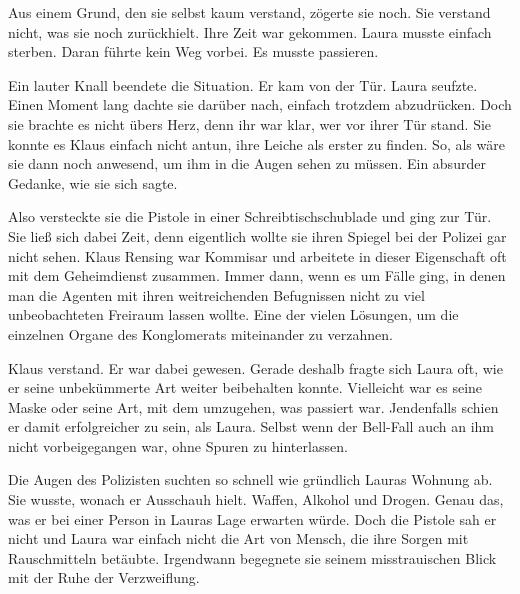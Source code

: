 \par

Aus einem Grund, den sie selbst kaum verstand, zögerte sie noch. Sie verstand nicht, was sie noch zurückhielt. Ihre Zeit war gekommen. Laura musste einfach sterben. Daran führte kein Weg vorbei. Es musste passieren.

\par

Ein lauter Knall beendete die Situation. Er kam von der Tür. Laura seufzte. Einen Moment lang dachte sie darüber nach, einfach trotzdem abzudrücken. Doch sie brachte es nicht übers Herz, denn ihr war klar, wer vor ihrer Tür stand. Sie konnte es Klaus einfach nicht antun, ihre Leiche als erster zu finden. So, als wäre sie dann noch anwesend, um ihm in die Augen sehen zu müssen. Ein absurder Gedanke, wie sie sich sagte.

\par

Also versteckte sie die Pistole in einer Schreibtischschublade und ging zur Tür. Sie ließ sich dabei Zeit, denn eigentlich wollte sie ihren Spiegel bei der Polizei gar nicht sehen. Klaus Rensing war Kommisar und arbeitete in dieser Eigenschaft oft mit dem Geheimdienst zusammen. Immer dann, wenn es um Fälle ging, in denen man die Agenten mit ihren weitreichenden Befugnissen nicht zu viel unbeobachteten Freiraum lassen wollte. Eine der vielen Lösungen, um die einzelnen Organe des Konglomerats miteinander zu verzahnen.

\par

Klaus verstand. Er war dabei gewesen. Gerade deshalb fragte sich Laura oft, wie er seine unbekümmerte Art weiter beibehalten konnte. Vielleicht war es seine Maske oder seine Art, mit dem umzugehen, was passiert war. Jendenfalls schien er damit erfolgreicher zu sein, als Laura. Selbst wenn der Bell-Fall auch an ihm nicht vorbeigegangen war, ohne Spuren zu hinterlassen.

\par

Die Augen des Polizisten suchten so schnell wie gründlich Lauras Wohnung ab. Sie wusste, wonach er Ausschauh hielt. Waffen, Alkohol und Drogen. Genau das, was er bei einer Person in Lauras Lage erwarten würde. Doch die Pistole sah er nicht und Laura war einfach nicht die Art von Mensch, die ihre Sorgen mit Rauschmitteln betäubte. Irgendwann begegnete sie seinem misstrauischen Blick mit der Ruhe der Verzweiflung.

\par

